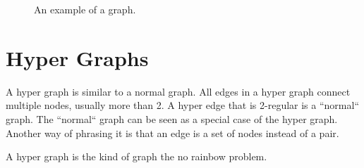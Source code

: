 \documentclass[msc,lith,english]{liuthesis}
\begin{document}
\begin{center}
\begin{figure}[h]
\centering
{}
  \caption{An example of a graph.}
  \label{figGraphExample}
\end{figure}
\end{center}


\section{Hyper Graphs}
A hyper graph is similar to a normal graph.
All edges in a hyper graph connect multiple nodes, usually more than 2.
A hyper edge that is 2-regular is a ``normal`` graph.
The ``normal`` graph can be seen as a special case of the hyper graph.
Another way of phrasing it is that an edge is a set of nodes instead of a pair.

A hyper graph is the kind of graph the no rainbow problem.
\end{document}
